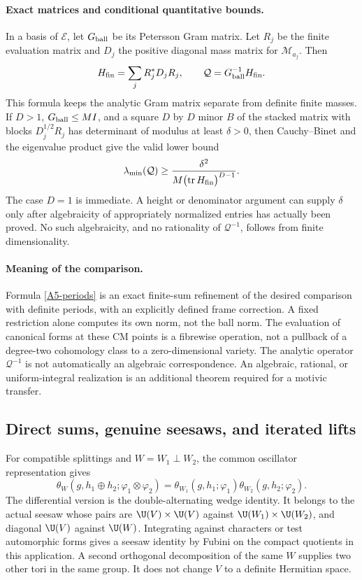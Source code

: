 \paragraph{Exact matrices and conditional quantitative bounds.}
In a basis of $\mathcal E$, let $G_{\rm ball}$ be its Petersson Gram
matrix. Let $R_j$ be the finite evaluation matrix and $D_j$ the
positive diagonal mass matrix for $\mathcal M_{a_j}$. Then
\[
 H_{\rm fin}=\sum_jR_j^*D_jR_j,\qquad
                  \mathcal Q=G_{\rm ball}^{-1}H_{\rm fin}.
\]
This formula keeps the analytic Gram matrix separate from definite
finite masses. If $D>1$, $G_{\rm ball}\leq M I$, and a square
$D$ by $D$ minor $B$ of the stacked matrix with blocks
$D_j^{1/2}R_j$ has determinant of modulus at least $\delta>0$, then
Cauchy--Binet and the eigenvalue product give the valid lower bound
\[
 \lambda_{\min}(\mathcal Q)
 \geq\frac{\delta^2}{M\bigl(\operatorname{tr}H_{\rm fin}\bigr)^{D-1}}.
\]
The case $D=1$ is immediate. A height or denominator argument can
supply $\delta$ only after algebraicity of appropriately normalized
entries has actually been proved. No such algebraicity, and no
rationality of $\mathcal Q^{-1}$, follows from finite dimensionality.

\paragraph{Meaning of the comparison.}
Formula \eqref{A5-periods} is an exact finite-sum refinement of the
desired comparison with definite periods, with an explicitly defined
frame correction. A fixed restriction alone computes its own norm,
not the ball norm. The evaluation of canonical forms at these CM
points is a fibrewise operation, not a pullback of a degree-two
cohomology class to a zero-dimensional variety. The analytic operator
$\mathcal Q^{-1}$ is not automatically an algebraic correspondence.
An algebraic, rational, or uniform-integral realization is an
additional theorem required for a motivic transfer.

\subsection{Direct sums, genuine seesaws, and iterated lifts}

For compatible splittings and $W=W_1\perp W_2$, the common oscillator
representation gives
\[
 \theta_W(g,h_1\oplus h_2;\varphi_1\otimes\varphi_2)
 =\theta_{W_1}(g,h_1;\varphi_1)
             \theta_{W_2}(g,h_2;\varphi_2).
\]
The differential version is the double-alternating wedge identity.
It belongs to the actual seesaw whose pairs are
$\U(V)\times\U(V)$ against $\U(W_1)\times\U(W_2)$, and diagonal
$\U(V)$ against $\U(W)$. Integrating against characters or test
automorphic forms gives a seesaw identity by Fubini on the compact
quotients in this application. A second orthogonal decomposition of
the same $W$ supplies two other tori in the same group. It does not
change $V$ to a definite Hermitian space.

